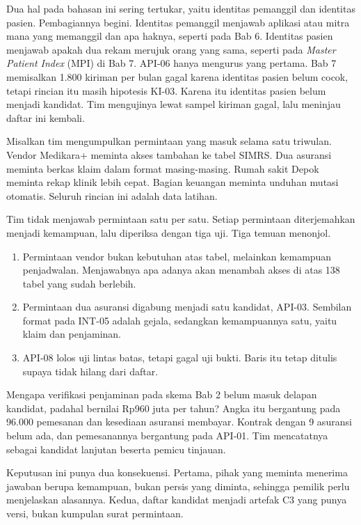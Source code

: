 Dua hal pada bahasan ini sering tertukar, yaitu identitas pemanggil dan identitas pasien. Pembagiannya begini. Identitas
pemanggil menjawab aplikasi atau mitra mana yang memanggil dan apa haknya, seperti pada Bab 6. Identitas pasien menjawab
apakah dua rekam merujuk orang yang sama, seperti pada \textit{Master Patient Index} (MPI) di Bab 7. API-06 hanya mengurus
yang pertama. Bab 7 memisalkan 1.800 kiriman per bulan gagal karena identitas pasien belum cocok, tetapi rincian itu masih
hipotesis KI-03. Karena itu identitas pasien belum menjadi kandidat. Tim mengujinya lewat sampel kiriman gagal, lalu
meninjau daftar ini kembali.

\begin{kasus}[title={Kasus Medikara Health: Delapan Permintaan Diterjemahkan Menjadi Kandidat}]
Misalkan tim mengumpulkan permintaan yang masuk selama satu triwulan. Vendor Medikara+ meminta akses tambahan ke tabel SIMRS.
Dua asuransi meminta berkas klaim dalam format masing-masing. Rumah sakit Depok meminta rekap klinik lebih cepat. Bagian
keuangan meminta unduhan mutasi otomatis. Seluruh rincian ini adalah data latihan.

Tim tidak menjawab permintaan satu per satu. Setiap permintaan diterjemahkan menjadi kemampuan, lalu diperiksa dengan tiga
uji. Tiga temuan menonjol.
\begin{enumerate}
  \item Permintaan vendor bukan kebutuhan atas tabel, melainkan kemampuan penjadwalan. Menjawabnya apa adanya akan menambah
        akses di atas 138 tabel yang sudah berlebih.
  \item Permintaan dua asuransi digabung menjadi satu kandidat, API-03. Sembilan format pada INT-05 adalah gejala, sedangkan
        kemampuannya satu, yaitu klaim dan penjaminan.
  \item API-08 lolos uji lintas batas, tetapi gagal uji bukti. Baris itu tetap ditulis supaya tidak hilang dari daftar.
\end{enumerate}

Mengapa verifikasi penjaminan pada skema Bab 2 belum masuk delapan kandidat, padahal bernilai Rp960 juta per tahun? Angka itu
bergantung pada 96.000 pemesanan dan kesediaan asuransi membayar. Kontrak dengan 9 asuransi belum ada, dan pemesanannya
bergantung pada API-01. Tim mencatatnya sebagai kandidat lanjutan beserta pemicu tinjauan.

Keputusan ini punya dua konsekuensi. Pertama, pihak yang meminta menerima jawaban berupa kemampuan, bukan persis yang diminta,
sehingga pemilik perlu menjelaskan alasannya. Kedua, daftar kandidat menjadi artefak C3 yang punya versi, bukan kumpulan surat
permintaan.
\end{kasus}

